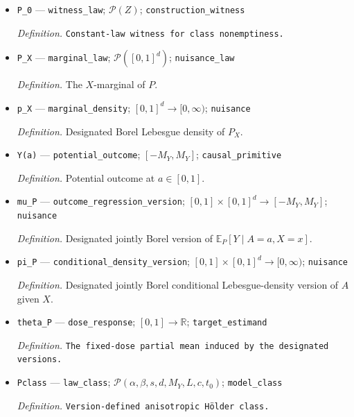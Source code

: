 \documentclass{article}
\begin{document}
\begin{itemize}
  \par\smallskip\noindent\emph{Definition.} Law of \(Z\).
  \item \texttt{P\_\allowbreak{}0} --- \texttt{witness\_\allowbreak{}law}; \(\mathcal P(Z)\); \texttt{construction\_\allowbreak{}witness}
  \par\smallskip\noindent\emph{Definition.} \texttt{Constant-\allowbreak{}law witness for class nonemptiness.}
  \item \texttt{P\_\allowbreak{}X} --- \texttt{marginal\_\allowbreak{}law}; \(\mathcal P([0,1]^d)\); \texttt{nuisance\_\allowbreak{}law}
  \par\smallskip\noindent\emph{Definition.} The \(X\)-marginal of \(P\).
  \item \texttt{p\_\allowbreak{}X} --- \texttt{marginal\_\allowbreak{}density}; \([0,1]^d\to[0,\infty)\); \texttt{nuisance}
  \par\smallskip\noindent\emph{Definition.} Designated Borel Lebesgue density of \(P_X\).
  \item \texttt{Y(a)} --- \texttt{potential\_\allowbreak{}outcome}; \([-M_Y,M_Y]\); \texttt{causal\_\allowbreak{}primitive}
  \par\smallskip\noindent\emph{Definition.} Potential outcome at \(a\in[0,1]\).
  \item \texttt{mu\_\allowbreak{}P} --- \texttt{outcome\_\allowbreak{}regression\_\allowbreak{}version}; \([0,1]\times[0,1]^d\to[-M_Y,M_Y]\); \texttt{nuisance}
  \par\smallskip\noindent\emph{Definition.} Designated jointly Borel version of \(\mathbb E_P[Y\mid A=a,X=x]\).
  \item \texttt{pi\_\allowbreak{}P} --- \texttt{conditional\_\allowbreak{}density\_\allowbreak{}version}; \([0,1]\times[0,1]^d\to[0,\infty)\); \texttt{nuisance}
  \par\smallskip\noindent\emph{Definition.} Designated jointly Borel conditional Lebesgue-density version of \(A\) given \(X\).
  \item \texttt{theta\_\allowbreak{}P} --- \texttt{dose\_\allowbreak{}response}; \([0,1]\to\mathbb R\); \texttt{target\_\allowbreak{}estimand}
  \par\smallskip\noindent\emph{Definition.} \texttt{The fixed-\allowbreak{}dose partial mean induced by the designated versions.}
  \item \texttt{Pclass} --- \texttt{law\_\allowbreak{}class}; \(\mathcal P(\alpha,\beta,s,d,M_Y,L,c,t_0)\); \texttt{model\_\allowbreak{}class}
  \par\smallskip\noindent\emph{Definition.} \texttt{Version-\allowbreak{}defined anisotropic Hölder class.}

\end{itemize}
\end{document}
